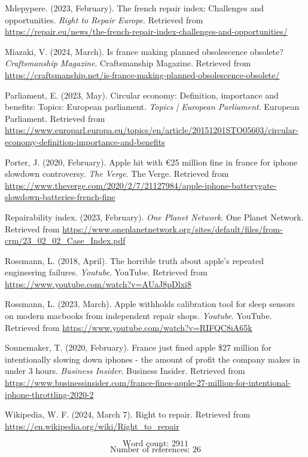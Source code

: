 \documentclass[11pt]{article}
\begin{document}
\begin{hangparas}{1.5em}{1}
\hypertarget{citeproc_bib_item_18}{Mdepypere. (2023, February). The french repair index: Challenges and opportunities. \textit{Right to Repair Europe}. Retrieved from \url{https://repair.eu/news/the-french-repair-index-challenges-and-opportunities/}}

\hypertarget{citeproc_bib_item_19}{Miazaki, V. (2024, March). Is france making planned obsolescence obsolete? \textit{Craftsmanship Magazine}. Craftsmanship Magazine. Retrieved from \url{https://craftsmanship.net/is-france-making-planned-obsolescence-obsolete/}}

\hypertarget{citeproc_bib_item_20}{Parliament, E. (2023, May). Circular economy: Definition, importance and benefits: Topics: European parliament. \textit{Topics | European Parliament}. European Parliament. Retrieved from \url{https://www.europarl.europa.eu/topics/en/article/20151201STO05603/circular-economy-definition-importance-and-benefits}}

\hypertarget{citeproc_bib_item_21}{Porter, J. (2020, February). Apple hit with €25 million fine in france for iphone slowdown controversy. \textit{The Verge}. The Verge. Retrieved from \url{https://www.theverge.com/2020/2/7/21127984/apple-iphone-batterygate-slowdown-batteries-french-fine}}

\hypertarget{citeproc_bib_item_22}{Repairability index. (2023, February). \textit{One Planet Network}. One Planet Network. Retrieved from \url{https://www.oneplanetnetwork.org/sites/default/files/from-crm/23_02_02_Case_Index.pdf}}

\hypertarget{citeproc_bib_item_23}{Rossmann, L. (2018, April). The horrible truth about apple’s repeated engineering failures. \textit{Youtube}. YouTube. Retrieved from \url{https://www.youtube.com/watch?v=AUaJ8pDlxi8}}

\hypertarget{citeproc_bib_item_24}{Rossmann, L. (2023, March). Apple withholds calibration tool for sleep sensors on modern macbooks from independent repair shops. \textit{Youtube}. YouTube. Retrieved from \url{https://www.youtube.com/watch?v=RIFQC8iA65k}}

\hypertarget{citeproc_bib_item_25}{Sonnemaker, T. (2020, February). France just fined apple \$27 million for intentionally slowing down iphones - the amount of profit the company makes in under 3 hours. \textit{Business Insider}. Business Insider. Retrieved from \url{https://www.businessinsider.com/france-fines-apple-27-million-for-intentional-iphone-throttling-2020-2}}

\hypertarget{citeproc_bib_item_26}{Wikipedia, W. F. (2024, March 7). Right to repair. Retrieved from \url{https://en.wikipedia.org/wiki/Right_to_repair}}\bigskip
\end{hangparas}

\[\text{Word count: 2911}\]
\[\text{Number of references: 26}\]
\end{document}
